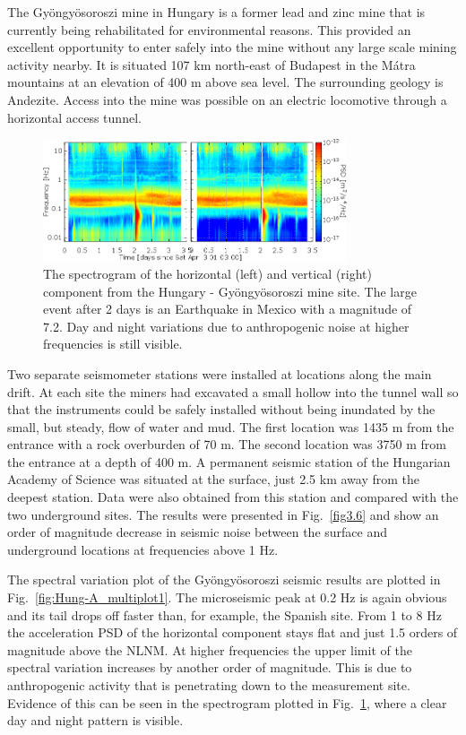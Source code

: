 The Gy\"ongy\"osoroszi mine in Hungary is a former lead and zinc mine that is currently being rehabilitated for environmental reasons. This provided an excellent opportunity to enter safely into the mine without any large scale mining activity nearby. It is situated 107 km north-east of Budapest in the M\'atra mountains at an elevation of 400 m above sea level. The surrounding geology is Andezite. Access into the mine was possible on an electric locomotive through a horizontal access tunnel. 
\begin{figure}[h!]
	\begin{center}
		\includegraphics[width=0.8\textwidth]{./Sec_SiteInfra/Figures/Hung-A_multiplot2}
		\caption{The spectrogram of the horizontal (left) and vertical (right) component from the Hungary - Gy\"ongy\"osoroszi mine site. The large event after 2 days is an Earthquake in Mexico with a magnitude of 7.2. Day and night variations due to anthropogenic noise at higher frequencies is still visible.}
		\label{fig:Hung-A_multiplot2}
	\end{center}
\end{figure}

Two separate seismometer stations were installed at locations along the main drift. At each site the miners had excavated a small hollow into the tunnel wall so that the instruments could be safely installed without being inundated by the small, but steady, flow of water and mud. The first location was 1435 m from the entrance with a rock overburden of 70 m. The second location was 3750 m from the entrance at a depth of 400 m. A permanent seismic station of the Hungarian Academy of Science was situated at the surface, just 2.5 km away from the deepest station. Data were also obtained from this station and compared with the two underground sites. The results were presented in Fig.~\ref{fig3.6} and show an order of magnitude decrease in seismic noise between the surface and underground locations at frequencies above 1 Hz. 

The spectral variation plot of the Gy\"ongy\"osoroszi seismic results are plotted in Fig.~\ref{fig:Hung-A_multiplot1}. The microseismic peak at 0.2 Hz is again obvious and its tail drops off faster than, for example, the Spanish site. From 1 to 8 Hz the acceleration PSD of the horizontal component stays flat and just 1.5 orders of magnitude above the NLNM. At higher frequencies the upper limit of the spectral variation increases by another order of magnitude. This is due to anthropogenic activity that is penetrating down to the measurement site. Evidence of this can be seen in the spectrogram plotted in Fig.~\ref{fig:Hung-A_multiplot2}, where a clear day and night pattern is visible.

